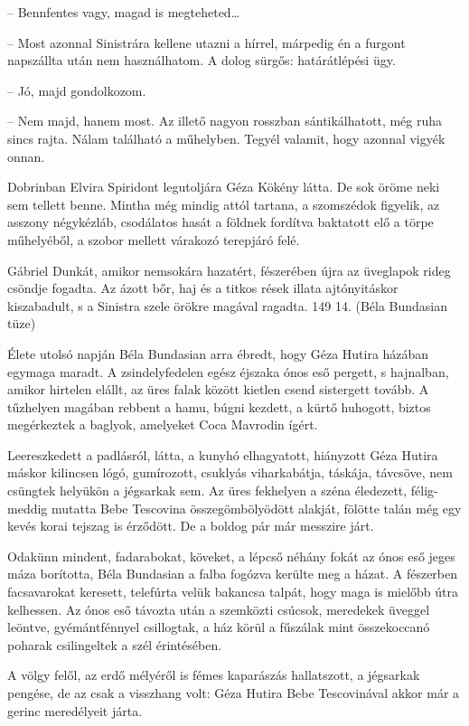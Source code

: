 \documentclass{IEEEtran}
\begin{document}
– Bennfentes vagy, magad is megteheted…

– Most azonnal Sinistrára kellene utazni a hírrel, márpedig én a furgont
napszállta után nem használhatom. A dolog sürgős: határátlépési ügy.

– Jó, majd gondolkozom.

– Nem majd, hanem most. Az illető nagyon rosszban sántikálhatott, még ruha
sincs rajta. Nálam található a műhelyben. Tegyél valamit, hogy azonnal vigyék
onnan.

Dobrinban Elvira Spiridont legutoljára Géza Kökény látta. De sok öröme neki
sem tellett benne. Mintha még mindig attól tartana, a szomszédok figyelik, az
asszony négykézláb, csodálatos hasát a földnek fordítva baktatott elő a törpe
műhelyéből, a szobor mellett várakozó terepjáró felé.

Gábriel Dunkát, amikor nemsokára hazatért, fészerében újra az üveglapok rideg
csöndje fogadta. Az ázott bőr, haj és a titkos rések illata ajtónyitáskor
kiszabadult, s a Sinistra szele örökre magával ragadta.
149
14. (Béla Bundasian tüze)

Élete utolsó napján Béla Bundasian arra ébredt, hogy Géza Hutira házában
egymaga maradt. A zsindelyfedelen egész éjszaka ónos eső pergett, s hajnalban,
amikor hirtelen elállt, az üres falak között kietlen csend sistergett tovább.
A tűzhelyen magában rebbent a hamu, búgni kezdett, a kürtő huhogott, biztos
megérkeztek a baglyok, amelyeket Coca Mavrodin ígért.

Leereszkedett a padlásról, látta, a kunyhó elhagyatott, hiányzott Géza Hutira
máskor kilincsen lógó, gumírozott, csuklyás viharkabátja, táskája, távcsöve,
nem csüngtek helyükön a jégsarkak sem. Az üres fekhelyen a széna éledezett,
félig-meddig mutatta Bebe Tescovina összegömbölyödött alakját, fölötte talán
még egy kevés korai tejszag is érződött. De a boldog pár már messzire járt.

Odakünn mindent, fadarabokat, köveket, a lépcső néhány fokát az ónos eső jeges
máza borította, Béla Bundasian a falba fogózva kerülte meg a házat. A
fészerben facsavarokat keresett, telefúrta velük bakancsa talpát, hogy maga is
mielőbb útra kelhessen. Az ónos eső távozta után a szemközti csúcsok,
meredekek üveggel leöntve, gyémántfénnyel csillogtak, a ház körül a fűszálak
mint összekoccanó poharak csilingeltek a szél érintésében.

A völgy felől, az erdő mélyéről is fémes kaparászás hallatszott, a jégsarkak
pengése, de az csak a visszhang volt: Géza Hutira Bebe Tescovinával akkor már
a gerinc meredélyeit járta.
\end{document}
